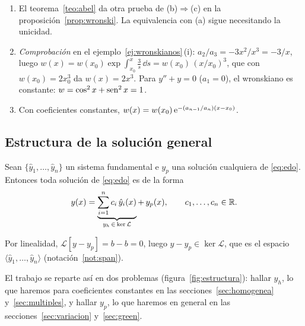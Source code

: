 \documentclass[11pt,twoside]{article}
\newcommand\Lop{\mathcal L}
\newcommand\yh{\hat y}
\newcommand\gen[1]{\langle#1\rangle}
\begin{document}
\begin{observacion}\label{obs:abel}
\begin{enumerate}[label=(\roman*)]
\item El teorema~\ref{teo:abel} da otra prueba de (b)$\Rightarrow$(c) en la proposición~\ref{prop:wronski}. La
equivalencia con (a) sigue necesitando la unicidad.
\item \emph{Comprobación} en el ejemplo~\ref{ej:wronskianos}\,(i): $a_2/a_3=-3x^2/x^3=-3/x$, luego
$w(x)=w(x_0)\exp\int_{x_0}^{x}\frac3s\,\dd s=\allowbreak w(x_0)\,(x/x_0)^3$, que con $w(x_0)=2x_0^3$ da $w(x)=2x^3$. Para $y''+y=0$
($a_1=0$), el wronskiano es constante: $w=\cos^2x+\operatorname{sen}^2x=1$.
\item Con coeficientes constantes, $w(x)=w(x_0)\,\mathrm{e}^{-(a_{n-1}/a_n)(x-x_0)}$.
\end{enumerate}
\end{observacion}

\subsection{Estructura de la solución general}

\begin{teorema}\label{teo:estructura}
Sean $\{\yh_1,\dots,\yh_n\}$ un sistema fundamental e $y_p$ una solución cualquiera de \eqref{eq:edo}. Entonces toda
solución de \eqref{eq:edo} es de la forma
\begin{equation}\label{eq:general}
y(x)=\underbrace{\sum_{i=1}^{n}c_i\,\yh_i(x)}_{y_h\,\in\,\ker\Lop}+\,y_p(x),\qquad c_1,\dots,c_n\in\R.
\end{equation}
\end{teorema}

\begin{demostracion}
Por linealidad, $\Lop[y-y_p]=b-b=0$, luego $y-y_p\in\ker\Lop$, que es el espacio $\gen{\yh_1,\dots,\yh_n}$
(notación~\ref{not:span}).
\end{demostracion}

El trabajo se reparte así en dos problemas (figura~\ref{fig:estructura}): hallar $y_h$, lo que haremos para coeficientes
constantes en las secciones~\ref{sec:homogenea} y~\ref{sec:multiples}, y hallar $y_p$, lo que haremos en general en las
secciones~\ref{sec:variacion} y~\ref{sec:green}.
\end{document}
